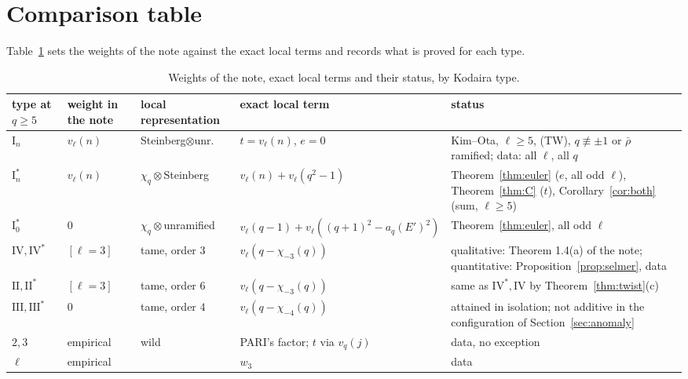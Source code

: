 \documentclass[11pt]{amsart}
\theoremstyle{definition}
\begin{document}
\section{Comparison table}\label{sec:table}
Table~\ref{tab:cmp} sets the weights of the note against the exact local terms and records what is proved for each type.
\begin{table}[htbp]\centering\footnotesize
\begin{tabular}{p{2.1cm}p{1.6cm}p{2.5cm}p{3.1cm}p{3.8cm}}
\toprule
type at $q\ge5$ & weight in the note & local representation & exact local term & status\\
\midrule
$\mathrm{I}_n$ & $v_\ell(n)$ & Steinberg$\otimes$unr. & $t=v_\ell(n)$, $e=0$ & Kim--Ota, $\ell\ge5$, (TW), $q\not\equiv\pm1$ or $\bar\rho$ ramified; data: all $\ell$, all $q$\\
$\mathrm{I}_n^*$ & $v_\ell(n)$ & $\chi_q\otimes$Steinberg & $v_\ell(n)+v_\ell(q^2-1)$ & Theorem~\ref{thm:euler} ($e$, all odd $\ell$), Theorem~\ref{thm:C} ($t$), Corollary~\ref{cor:both} (sum, $\ell\ge5$)\\
$\mathrm{I}_0^*$ & $0$ & $\chi_q\otimes$unramified & $v_\ell(q-1)+v_\ell((q+1)^2-a_q(E')^2)$ & Theorem~\ref{thm:euler}, all odd $\ell$\\
$\mathrm{IV},\mathrm{IV}^*$ & $[\ell=3]$ & tame, order $3$ & $v_\ell(q-\chi_{-3}(q))$ & qualitative: Theorem 1.4(a) of the note; quantitative: Proposition~\ref{prop:selmer}, data\\
$\mathrm{II},\mathrm{II}^*$ & $[\ell=3]$ & tame, order $6$ & $v_\ell(q-\chi_{-3}(q))$ & same as $\mathrm{IV}^*,\mathrm{IV}$ by Theorem~\ref{thm:twist}(c)\\
$\mathrm{III},\mathrm{III}^*$ & $0$ & tame, order $4$ & $v_\ell(q-\chi_{-4}(q))$ & attained in isolation; not additive in the configuration of Section~\ref{sec:anomaly}\\
$2,3$ & empirical & wild & PARI's factor; $t$ via $v_q(j)$ & data, no exception\\
$\ell$ & empirical & & $w_3$ & data\\
\bottomrule
\end{tabular}
\caption{Weights of the note, exact local terms and their status, by Kodaira type.}\label{tab:cmp}
\end{table}
\end{document}
